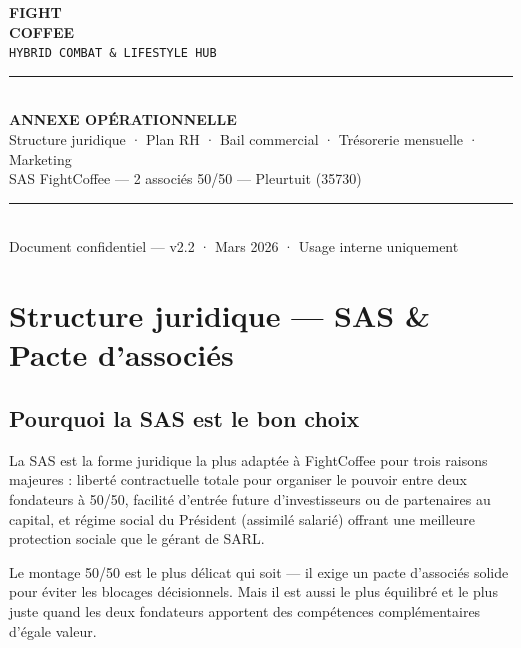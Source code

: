 \documentclass[11pt, a4paper]{article}
\newcommand{\eyebrow}[1]{%
  \vspace{4pt}{\small\color{fc-ink3}\texttt{— #1}}\vspace{2pt}
}
\begin{document}
\thispagestyle{empty}
\vspace*{3cm}
\begin{center}
  {\fontsize{48}{52}\selectfont\bfseries\color{fc-ink} FIGHT}\\[2pt]
  {\fontsize{48}{52}\selectfont\bfseries\color{fc-red} COFFEE}\\[12pt]
  {\large\color{fc-ink3}\texttt{HYBRID COMBAT \& LIFESTYLE HUB}}\\[40pt]
  \color{fc-rule}\rule{10cm}{0.6pt}\\[24pt]
  {\Large\bfseries\color{fc-ink} ANNEXE OPÉRATIONNELLE}\\[10pt]
  {\normalsize\color{fc-ink2} Structure juridique · Plan RH · Bail commercial · Trésorerie mensuelle · Marketing}\\[6pt]
  {\normalsize\color{fc-ink2} SAS FightCoffee — 2 associés 50/50 — Pleurtuit (35730)}\\[40pt]
  \color{fc-rule}\rule{10cm}{0.6pt}\\[20pt]
  {\small\color{fc-ink3} Document confidentiel — v2.2 · Mars 2026 · Usage interne uniquement}
\end{center}

\newpage
\tableofcontents
\newpage

\section{Structure juridique — SAS \& Pacte d'associés}
\eyebrow{A — STRUCTURE JURIDIQUE}

\subsection{Pourquoi la SAS est le bon choix}

La SAS est la forme juridique la plus adaptée à FightCoffee pour trois raisons majeures : liberté contractuelle totale pour organiser le pouvoir entre deux fondateurs à 50/50, facilité d'entrée future d'investisseurs ou de partenaires au capital, et régime social du Président (assimilé salarié) offrant une meilleure protection sociale que le gérant de SARL.

Le montage 50/50 est le plus délicat qui soit — il exige un pacte d'associés solide pour éviter les blocages décisionnels. Mais il est aussi le plus équilibré et le plus juste quand les deux fondateurs apportent des compétences complémentaires d'égale valeur.
\end{document}
